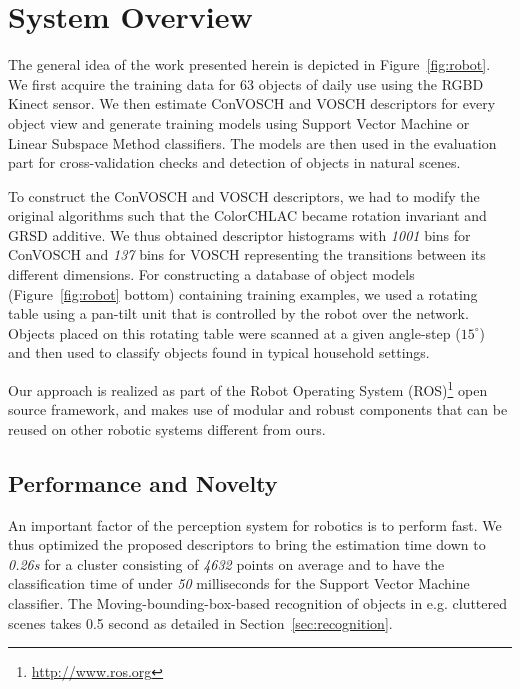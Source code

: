 \documentclass[conference]{sty/IEEEtran}
\begin{document}
\section{System Overview}
\label{sec:overview}
The general idea of the work presented herein is depicted in 
Figure~\ref{fig:robot}. We first acquire the training data for 63 objects
of daily use using the RGBD Kinect sensor. We then estimate ConVOSCH and VOSCH descriptors 
for every object view and generate training models using Support Vector
Machine or Linear Subspace Method classifiers. The models are then used
in the evaluation part for cross-validation checks and detection of 
objects in natural scenes.

To construct the ConVOSCH and VOSCH descriptors, we had to modify the original algorithms
such that the ColorCHLAC became rotation invariant and GRSD 
additive. We thus obtained descriptor histograms with 
\emph{1001} bins for ConVOSCH and \emph{137} bins for VOSCH representing the transitions between its different dimensions.
For constructing a database of object models (Figure~\ref{fig:robot} bottom)
containing training examples, we used a rotating
table using a pan-tilt unit that is controlled by the robot over the
network. Objects placed on this rotating table were scanned at a given
angle-step ($15^\circ$) and then used to classify objects found in
typical household settings.

Our approach is realized as part of the Robot Operating System
(ROS)\footnote{\url{http://www.ros.org}} open source framework, and makes
use of modular and robust components that can be reused on other robotic
systems different from ours.

\subsection{Performance and Novelty}
An important factor of the perception system for robotics is to perform fast. We thus optimized
the proposed descriptors to bring the estimation time down to \emph{0.26s} for a cluster consisting of 
\emph{4632} points on average and to have the classification time of under \emph{50} milliseconds
for the Support Vector Machine classifier. The Moving-bounding-box-based
recognition of objects in e.g. cluttered scenes takes 0.5 second as detailed
in Section~\ref{sec:recognition}.
\end{document}
